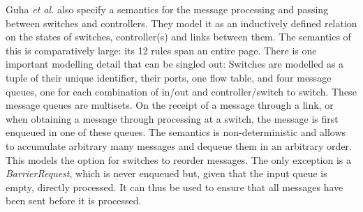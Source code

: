 Guha \emph{et al.} also specify a semantics for the message processing and passing between switches and controllers.
They model it as an inductively defined relation on the states of switches, controller(s) and links between them.
The semantics of this is comparatively large: its 12 rules span an entire page.
There is one important modelling detail that can be singled out:
Switches are modelled as a tuple of their unique identifier, their ports, one flow table, and four message queues, one for each combination of in/out and controller/switch to switch.
These message queues are multisets.
On the receipt of a message through a link, or when obtaining a message through processing at a switch, the message is first enqueued in one of these queues.
The semantics is non-deterministic and allows to accumulate arbitrary many messages and dequeue them in an arbitrary order.
This models the option for switches to reorder messages.
The only exception is a \emph{BarrierRequest}, which is never enqueued but, given that the input queue is empty, directly processed.
It can thus be used to ensure that all messages have been sent before it is processed.

